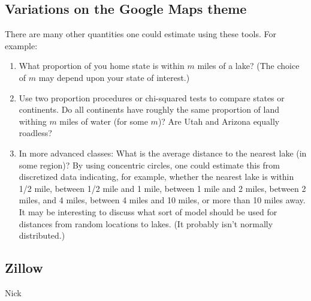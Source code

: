 \subsection{Variations on the Google Maps theme}

There are many other quantities one could estimate using these tools.  For example:
\begin{enumerate}
\item
What proportion of you home state is within $m$ miles of a lake?  (The choice of $m$ may depend upon
your state of interest.)
\item
Use two proportion procedures  or chi-squared tests to compare states or continents.  
Do all continents have roughly the same proportion of land withing $m$ miles of water (for some $m$)?
Are Utah and Arizona equally roadless?

\item
In more advanced classes: What is the average distance to the nearest lake (in some region)?
By using concentric circles, one could estimate this from discretized data indicating, for example,
whether the nearest lake is within 1/2 mile, between 1/2 mile and 1 mile, between 1 mile and 2 miles,
between 2 miles, and 4 miles, between 4 miles and 10 miles, or more than 10 miles away.  It may be 
interesting to discuss what sort of model should be used for distances from random locations to lakes.
(It probably isn't normally distributed.)
%
\end{enumerate}

\subsection{Zillow}
Nick 

